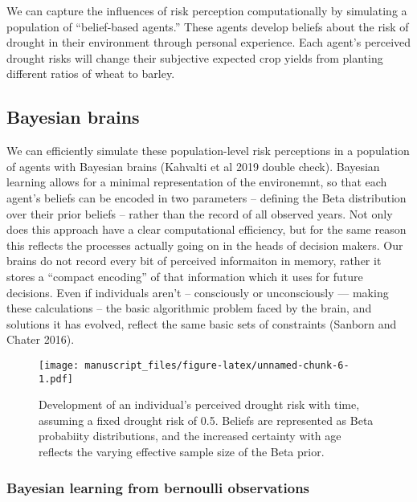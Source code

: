 \documentclass[smallextended]{svjour3}       %
\begin{document}
We can capture the influences of risk perception computationally by
simulating a population of ``belief-based agents.'' These agents develop
beliefs about the risk of drought in their environment through personal
experience. Each agent's perceived drought risks will change their
subjective expected crop yields from planting different ratios of wheat
to barley.

\hypertarget{bayesian-brains}{%
\subsection{Bayesian brains}\label{bayesian-brains}}

We can efficiently simulate these population-level risk perceptions in a
population of agents with Bayesian brains (Kahvalti et al 2019 double
check). Bayesian learning allows for a minimal representation of the
environemnt, so that each agent's beliefs can be encoded in two
parameters -- defining the Beta distribution over their prior beliefs --
rather than the record of all observed years. Not only does this
approach have a clear computational efficiency, but for the same reason
this reflects the processes actually going on in the heads of decision
makers. Our brains do not record every bit of perceived informaiton in
memory, rather it stores a ``compact encoding'' of that information
which it uses for future decisions. Even if individuals aren't --
consciously or unconsciously --- making these calculations -- the basic
algorithmic problem faced by the brain, and solutions it has evolved,
reflect the same basic sets of constraints (Sanborn and Chater 2016).

\begin{figure}
\centering
\texttt{[image: manuscript\_files/figure-latex/unnamed-chunk-6-1.pdf]}
\caption{Development of an individual's perceived drought risk with
time, assuming a fixed drought risk of 0.5. Beliefs are represented as
Beta probabiity distributions, and the increased certainty with age
reflects the varying effective sample size of the Beta prior.}
\end{figure}

\hypertarget{bayesian-learning-from-bernoulli-observations}{%
\subsubsection{Bayesian learning from bernoulli
observations}\label{bayesian-learning-from-bernoulli-observations}}
\end{document}
